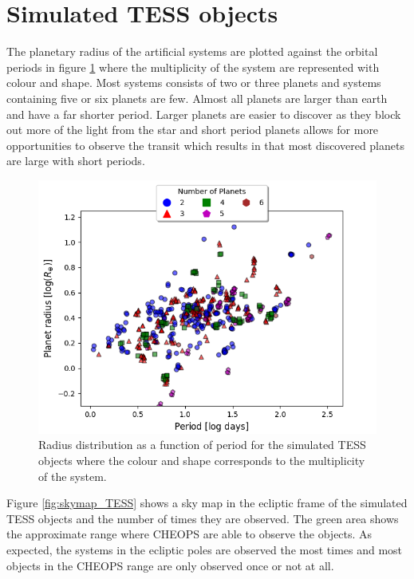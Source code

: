 \documentclass[12pt]{report}
\begin{document}

\section{Simulated TESS objects}
	The planetary radius of the artificial systems are plotted against the orbital periods in figure \ref{fig:RP_plot_temp_multi} where the multiplicity of the system are represented with colour and shape. Most systems consists of two or three planets and systems containing five or six planets are few. Almost all planets are larger than earth and have a far shorter period. Larger planets are easier to discover as they block out more of the light from the star and short period planets allows for more opportunities to observe the transit which results in that most discovered planets are large with short periods.

\begin{figure}[h!]
 	 \centering
 	 \includegraphics[width=\textwidth]{img/R_P-plot_numP1.png}
 	  	 \caption{Radius distribution as a function of period for the simulated TESS objects where the colour and shape corresponds to the multiplicity of the system.}
 	  	 \label{fig:RP_plot_temp_multi}
\end{figure}
	\newpage Figure \ref{fig:skymap_TESS} shows a sky map in the ecliptic frame of the simulated TESS objects and the number of times they are observed. The green area shows the approximate range where CHEOPS are able to observe the objects.  As expected, the systems in the ecliptic poles are observed the most times and most objects in the CHEOPS range are only observed once or not at all.
\end{document}
